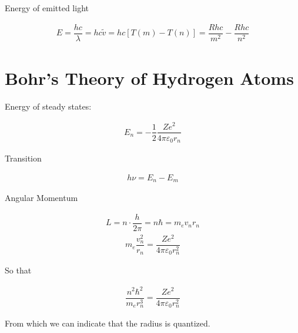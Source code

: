Energy of emitted light

\begin{equation*}
  \begin{aligned}
    E = \dfrac{h c}{\lambda} = h c \tilde{v} = hc \left[ T (m) - T (n) \right] = \dfrac{R h c}{m^2} - \dfrac{R h c}{n^2}  
  \end{aligned}
\end{equation*}

\section{Bohr's Theory of Hydrogen Atoms}

Energy of steady states:

\begin{equation*}
  \begin{aligned}
    E_n = - \dfrac{1}{2} \dfrac{Z e^2}{4 \pi \varepsilon_0 r_n}  
  \end{aligned}
\end{equation*}

Transition

\begin{equation*}
  \begin{aligned}
    h \nu = E_n - E_m
  \end{aligned}
\end{equation*}

Angular Momentum

\begin{equation*}
  \begin{aligned}
    L = n \cdot \dfrac{h}{2 \pi} = n \hbar = m_e v_n r_n
  \end{aligned}
\end{equation*}
\begin{equation*}
  \begin{aligned}
    m_e \dfrac{v_n^2}{r_n} = \dfrac{Z e^2}{4 \pi \varepsilon_0 r_n^2}  
  \end{aligned}
\end{equation*}

So that

\begin{equation*}
  \begin{aligned}
    \dfrac{n^2 \hbar^2}{m_e r_n^3} = \dfrac{Z e^2}{4 \pi \varepsilon_0 r_n^2}
  \end{aligned}
\end{equation*}

From which we can indicate that the radius is quantized.

